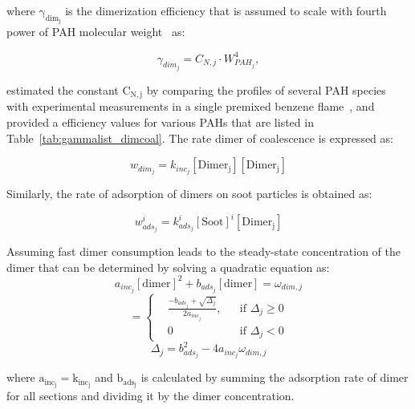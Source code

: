 \noindent where $\mathrm{\gamma_{dim_j}}$ is the dimerization efficiency that is assumed to scale with fourth power of PAH molecular weight~\cite{blanquart2009analyzing} as:

\begin{equation}
	\gamma_{dim_j}=
	C_{N,j}\cdot W_{PAH_j}^4
	\label{eqn:gamma_dimcoal},
\end{equation} 

\citet{blanquart2009joint} estimated the constant $\mathrm{C_{N,j}}$ by comparing the profiles of several PAH species with experimental measurements in a single premixed benzene flame~\citep{tregrossi1999combustion}, and provided a efficiency values for various PAHs that are listed in Table~\ref{tab:gammalist_dimcoal}. The rate dimer of coalescence is expressed as:

\begin{equation}
	w_{dim_j} = k_{inc_{j}} [\mathrm{Dimer_j}] [\mathrm{Dimer_j}]
	\label{eqn:wdim_dimcoal}
\end{equation}

Similarly, the rate of adsorption of dimers on soot particles is obtained as:

\begin{equation}
	w^i_{ads_j} = k^i_{ads_{j}} [\mathrm{Soot}]^i [\mathrm{Dimer_j}]
\end{equation}

Assuming fast dimer consumption leads to the steady-state concentration of the dimer that can be determined by solving a quadratic equation as:
\begin{equation}
	a_{inc_j}[\mathrm{dimer}]^2+b_{ads_j}[\mathrm{dimer}]=\omega_{dim,j}
	\label{eqn:quad_dimcoal}
\end{equation}
\begin{equation}
	[\mathrm{Dimer_j}]=
	\left\{
	\begin{aligned}
		&\frac{-b_{ads_j}+\sqrt{\Delta_j}}{2a_{inc_j}},
		&&
		\text{if } \Delta_j \ge 0
		\\
		& 0 
		&&
		\text{if } \Delta_j < 0
	\end{aligned}
	\right.
	\label{eqn:dimer_dimcoal}
\end{equation}
\begin{equation}
	\Delta_j = b_{ads_j}^2-4a_{inc_j}\omega_{dim,j}
	\label{eqn:delta_dimcoal}
\end{equation}

where $\mathrm{a_{inc_j} = k_{inc_{j}}}$ and $\mathrm{b_{ads_j}}$ is calculated by summing the adsorption rate of dimer for all sections and dividing it by the dimer concentration.

